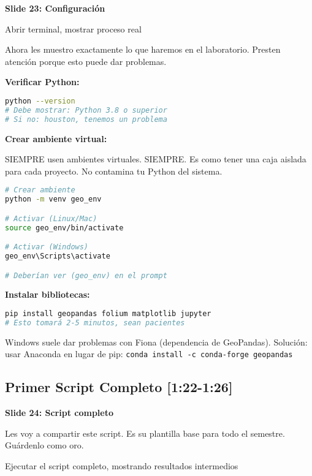 \documentclass[11pt,a4paper]{article}
\newcommand{\tiempo}[1]{\textcolor{timecolor}{\faIcon{clock} \textbf{[#1]}}}
\newcommand{\decir}[1]{\begin{tcolorbox}[colback=blue!5,colframe=usachblue,title={\faIcon{microphone} DECIR}]#1\end{tcolorbox}}
\newcommand{\hacer}[1]{\begin{tcolorbox}[colback=green!5,colframe=green!50!black,title={\faIcon{hand-point-right} HACER}]#1\end{tcolorbox}}
\newcommand{\alerta}[1]{\begin{tcolorbox}[colback=red!5,colframe=red,title={\faIcon{exclamation-triangle} ALERTA}]#1\end{tcolorbox}}
\begin{document}
\textbf{Slide 23: Configuración}

\hacer{Abrir terminal, mostrar proceso real}

\decir{Ahora les muestro exactamente lo que haremos en el laboratorio. Presten atención porque esto puede dar problemas.}

\textbf{Verificar Python:}

\begin{lstlisting}[language=bash]
python --version
# Debe mostrar: Python 3.8 o superior
# Si no: houston, tenemos un problema
\end{lstlisting}

\textbf{Crear ambiente virtual:}

\decir{SIEMPRE usen ambientes virtuales. SIEMPRE. Es como tener una caja aislada para cada proyecto. No contamina tu Python del sistema.}

\begin{lstlisting}[language=bash]
# Crear ambiente
python -m venv geo_env

# Activar (Linux/Mac)
source geo_env/bin/activate

# Activar (Windows)
geo_env\Scripts\activate

# Deberían ver (geo_env) en el prompt
\end{lstlisting}

\textbf{Instalar bibliotecas:}

\begin{lstlisting}[language=bash]
pip install geopandas folium matplotlib jupyter
# Esto tomará 2-5 minutos, sean pacientes
\end{lstlisting}

\alerta{Windows suele dar problemas con Fiona (dependencia de GeoPandas). Solución: usar Anaconda en lugar de pip:
\texttt{conda install -c conda-forge geopandas}}

\subsection{Primer Script Completo \tiempo{1:22-1:26}}

\textbf{Slide 24: Script completo}

\decir{Les voy a compartir este script. Es su plantilla base para todo el semestre. Guárdenlo como oro.}

\hacer{Ejecutar el script completo, mostrando resultados intermedios}
\end{document}
